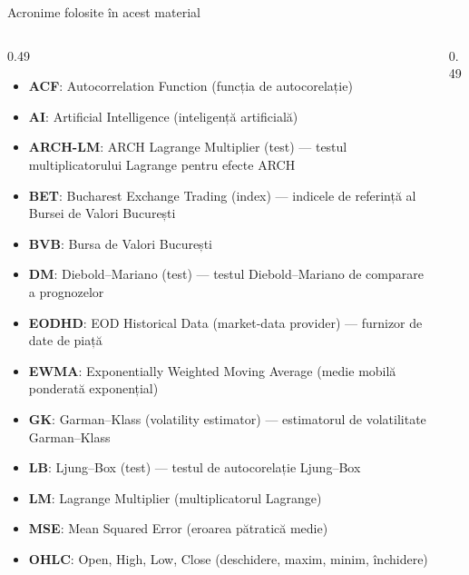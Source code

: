 
{
\begin{frame}[noframenumbering]
    \titlepage
\end{frame}
}
\begin{frame}{Acronime folosite în acest material}
\begin{columns}[T]
\begin{column}{0.49\textwidth}
\begin{itemize}\setlength{\itemsep}{0pt}
    \item \textbf{ACF}: Autocorrelation Function (funcția de autocorelație)
    \item \textbf{AI}: Artificial Intelligence (inteligență artificială)
    \item \textbf{ARCH-LM}: ARCH Lagrange Multiplier (test) — testul multiplicatorului Lagrange pentru efecte ARCH
    \item \textbf{BET}: Bucharest Exchange Trading (index) — indicele de referință al Bursei de Valori București
    \item \textbf{BVB}: Bursa de Valori București
    \item \textbf{DM}: Diebold–Mariano (test) — testul Diebold–Mariano de comparare a prognozelor
    \item \textbf{EODHD}: EOD Historical Data (market-data provider) — furnizor de date de piață
    \item \textbf{EWMA}: Exponentially Weighted Moving Average (medie mobilă ponderată exponențial)
    \item \textbf{GK}: Garman–Klass (volatility estimator) — estimatorul de volatilitate Garman–Klass
    \item \textbf{LB}: Ljung–Box (test) — testul de autocorelație Ljung–Box
    \item \textbf{LM}: Lagrange Multiplier (multiplicatorul Lagrange)
    \item \textbf{MSE}: Mean Squared Error (eroarea pătratică medie)
    \item \textbf{OHLC}: Open, High, Low, Close (deschidere, maxim, minim, închidere)
\end{itemize}
\end{column}
\begin{column}{0.49\textwidth}
\begin{itemize}\setlength{\itemsep}{0pt}

\end{itemize}
\end{column}
\end{columns}
\end{frame}
